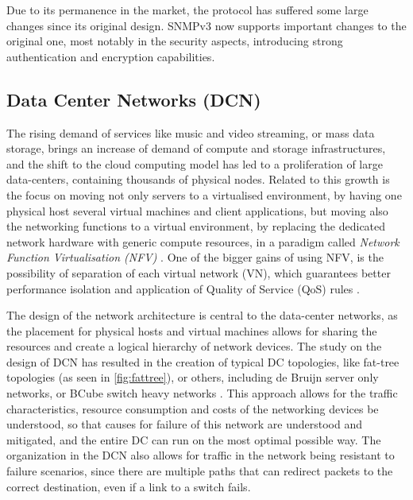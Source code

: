 \par Due to its permanence in the market, the protocol has suffered some large changes since its original design. SNMPv3 now supports important changes to the
original one, most notably in the security aspects, introducing strong authentication and encryption capabilities.

\subsection {Data Center Networks (DCN)}

\par The rising demand of services like music and video streaming, or mass data storage, brings an increase of demand of compute and storage infrastructures, and the
shift to the cloud computing model has led to a proliferation of large data-centers, containing thousands of physical nodes. Related to this growth is the focus on
moving not only servers to a virtualised environment, by having one physical host several virtual machines and client applications, but moving also the networking
functions to a virtual environment, by replacing the dedicated network hardware with generic compute resources, in a paradigm called
\textit{Network Function Virtualisation (NFV)} \cite{schulz-zander_opensdwn:_2015}. One of the bigger gains of using NFV, is the possibility of separation of each 
virtual network (VN), which guarantees better performance isolation and application of Quality of Service (QoS) rules \cite{berde_onos:_2014}. 

\par The design of the network architecture is central to the data-center networks, as the placement for physical hosts and virtual machines allows for sharing the 
resources and create a logical hierarchy of network devices. The study on the design of DCN has resulted in the creation of typical DC topologies, like fat-tree
topologies (as seen in \ref{fig:fattree}), or others, including de Bruijn server only networks, or BCube switch heavy networks \cite{popa_cost_2010}. This approach
allows for the traffic characteristics, resource consumption and costs of the networking devices be understood, so that causes for failure of this network are
understood and mitigated, and the entire DC can run on the most optimal possible way. The organization in the DCN also allows for traffic in the network being
resistant to failure scenarios, since there are multiple paths that can redirect packets to the correct destination, even if a link to a switch fails.

